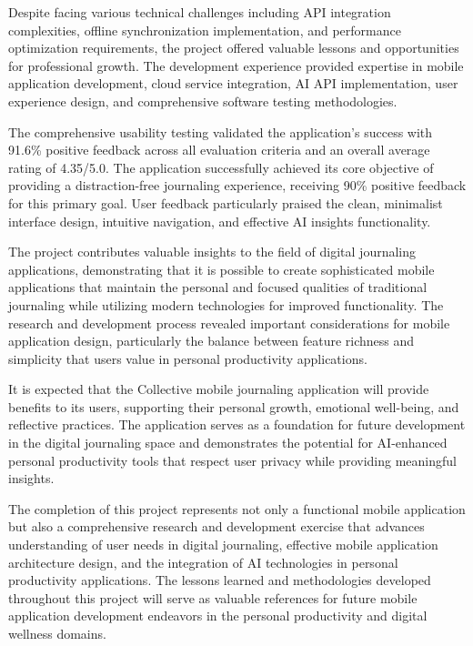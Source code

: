 Despite facing various technical challenges including API integration complexities, offline synchronization implementation, and performance optimization requirements, the project offered valuable lessons and opportunities for professional growth. The development experience provided expertise in mobile application development, cloud service integration, AI API implementation, user experience design, and comprehensive software testing methodologies.

The comprehensive usability testing validated the application's success with 91.6\% positive feedback across all evaluation criteria and an overall average rating of 4.35/5.0. The application successfully achieved its core objective of providing a distraction-free journaling experience, receiving 90\% positive feedback for this primary goal. User feedback particularly praised the clean, minimalist interface design, intuitive navigation, and effective AI insights functionality.

The project contributes valuable insights to the field of digital journaling applications, demonstrating that it is possible to create sophisticated mobile applications that maintain the personal and focused qualities of traditional journaling while utilizing modern technologies for improved functionality. The research and development process revealed important considerations for mobile application design, particularly the balance between feature richness and simplicity that users value in personal productivity applications.

It is expected that the Collective mobile journaling application will provide benefits to its users, supporting their personal growth, emotional well-being, and reflective practices. The application serves as a foundation for future development in the digital journaling space and demonstrates the potential for AI-enhanced personal productivity tools that respect user privacy while providing meaningful insights.

The completion of this project represents not only a functional mobile application but also a comprehensive research and development exercise that advances understanding of user needs in digital journaling, effective mobile application architecture design, and the integration of AI technologies in personal productivity applications. The lessons learned and methodologies developed throughout this project will serve as valuable references for future mobile application development endeavors in the personal productivity and digital wellness domains.